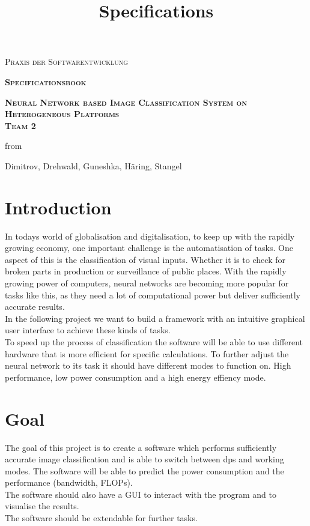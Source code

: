 \documentclass[parskip=full]{scrartcl}
\title{Specifications}
\author{}
\begin{document}
\renewcommand{\figurename}{Figure}
\begin{titlepage}
\centering
	\vspace{3cm}
	{\scshape\LARGE Praxis der Softwarentwicklung\par}
	\vspace{2cm}
	{\scshape\Huge\bfseries Specificationsbook \par}	
	\vspace{2cm}
	{\scshape\Huge\bfseries Neural Network based Image Classification System on Heterogeneous Platforms \\ Team 2 \par}
	\vspace{2cm}
	{\Large from \par}
	\vspace{0.25cm}
	{\Large Dimitrov, Drehwald, Guneshka, Häring, Stangel \par}
	\vfill
\end{titlepage}
\newpage
\tableofcontents
\newpage
\section{Introduction}
In todays world of globalisation and digitalisation, to keep up with the rapidly growing economy, one important challenge is the automatisation of tasks. One aspect of this is the classification of visual inputs. Whether it is to check for broken parts in production or surveillance of public places. With the rapidly growing power of computers, neural networks are becoming more popular for tasks like this, as they need a lot of computational power but deliver sufficiently accurate results.\\
In the following project we want to build a framework with an intuitive graphical user interface to achieve these kinds of tasks.\\
To speed up the process of classification the software will be able to use different hardware that is more efficient for specific calculations. To further adjust the neural network to its task it should have different modes to function on. High \gls{performance}, low \gls{power consumption} and a high energy effiency mode. \\


\section{Goal}
The goal of this project is to create a software which performs sufficiently accurate \gls{image classification} and is able to switch between \glspl{dp} and working modes. The software will be able to predict the \gls{power consumption} and the performance (bandwidth, FLOPs).\\
The software should also have a GUI to interact with the program and to visualise the results.\\
The software should be extendable for further tasks.
\end{document}
